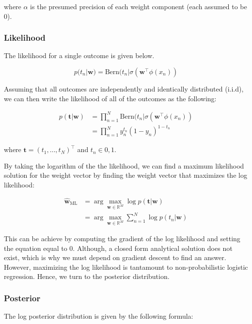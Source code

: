 \documentclass[12pt]{article}
\begin{document}
where $\alpha$ is the presumed precision of each weight component (each assumed to be 0).

\subsubsection{Likelihood}

The likelihood for a single outcome is given below.

\begin{equation}
    p(t_n|\textbf{w}) = \mathrm{Bern}(t_n | \sigma(\textbf{w}^\top \phi(x_n))
\end{equation}

Assuming that all outcomes are independently and identically distributed (i.i.d), we can then write the likelihood of all of the outcomes as the following:

\begin{align}
    p(\textbf{t}|\textbf{w}) &= \prod_{n=1}^N \mathrm{Bern}(t_n | \sigma(\textbf{w}^\top\phi(x_n)) \\
    	&= \prod_{n=1}^N y_n^{t_n}(1-y_n)^{1-t_n}
\end{align}

where $\textbf{t} = (t_1, \ldots, t_N)^\top$ and $t_n \in {0,1}$.

By taking the logarithm of the the likelihood, we can find a maximum likelihood solution for the weight vector by finding the weight vector that maximizes the log likelihood:

\begin{align}
    \hat{\textbf{w}}_{\mathrm{ML}} &= \arg\max_{\textbf{w} \in \mathbb{R}^M} \log p(\textbf{t}|\textbf{w}) \\
    &= \arg \max_{\textbf{w} \in \mathbb{R}^M} \sum_{n=1}^N \log p(t_n|\textbf{w})
\end{align}

This can be achieve by computing the gradient of the log likelihood and setting the equation equal to 0. Although, a closed form analytical solution does not exist, which is why we must depend on gradient descent to find an answer. However, maximizing the log likelihood is tantamount to non-probabilistic logistic regression. Hence, we turn to the posterior distribution.

\subsubsection{Posterior}

The log posterior distribution is given by the following formula:
\end{document}

